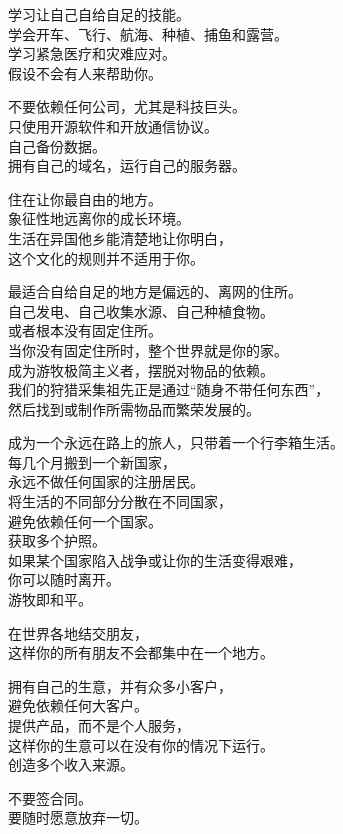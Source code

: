 \documentclass[
]{article}
\begin{document}
学习让自己自给自足的技能。\\
学会开车、飞行、航海、种植、捕鱼和露营。\\
学习紧急医疗和灾难应对。\\
假设不会有人来帮助你。

不要依赖任何公司，尤其是科技巨头。\\
只使用开源软件和开放通信协议。\\
自己备份数据。\\
拥有自己的域名，运行自己的服务器。

住在让你最自由的地方。\\
象征性地远离你的成长环境。\\
生活在异国他乡能清楚地让你明白，\\
这个文化的规则并不适用于你。

最适合自给自足的地方是偏远的、离网的住所。\\
自己发电、自己收集水源、自己种植食物。\\
或者根本没有固定住所。\\
当你没有固定住所时，整个世界就是你的家。\\
成为游牧极简主义者，摆脱对物品的依赖。\\
我们的狩猎采集祖先正是通过``随身不带任何东西''，\\
然后找到或制作所需物品而繁荣发展的。

成为一个永远在路上的旅人，只带着一个行李箱生活。\\
每几个月搬到一个新国家，\\
永远不做任何国家的注册居民。\\
将生活的不同部分分散在不同国家，\\
避免依赖任何一个国家。\\
获取多个护照。\\
如果某个国家陷入战争或让你的生活变得艰难，\\
你可以随时离开。\\
游牧即和平。

在世界各地结交朋友，\\
这样你的所有朋友不会都集中在一个地方。

拥有自己的生意，并有众多小客户，\\
避免依赖任何大客户。\\
提供产品，而不是个人服务，\\
这样你的生意可以在没有你的情况下运行。\\
创造多个收入来源。

不要签合同。\\
要随时愿意放弃一切。
\end{document}
